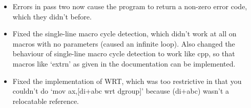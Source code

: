\begin{itemize}
{        operand with `\&' is equivalent to enclosing it in square brackets,
        at the request of Fox Cutter.}
    \item{Errors in pass two now cause the program to return a non-zero error
        code, which they didn't before.}
    \item{Fixed the single-line macro cycle detection, which didn't work at
        all on macros with no parameters (caused an infinite loop). Also
        changed the behaviour of single-line macro cycle detection to work
        like cpp, so that macros like `extrn' as given in the documentation
        can be implemented.}
    \item{Fixed the implementation of WRT, which was too restrictive in that
        you couldn't do `mov ax,[di+abc wrt dgroup]' because (di+abc) wasn't
        a relocatable reference.}
\end{itemize}


